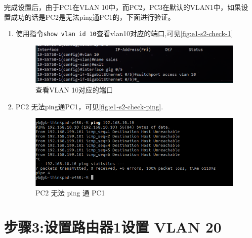 \documentclass{myreport}
\begin{document}
完成设置后，由于PC1在VLAN 10中，而PC2，PC3在默认的VLAN1中，如果设置成功的话是PC2是无法ping通PC1的，下面进行验证。

\begin{enumerate}
    \item 使用指令\texttt{show vlan id 10}查看vlan10对应的端口,可见\autoref{fig:e1-s2-check-1}
    \begin{figure}[htp]
        \centering
        \includegraphics[width=13cm]{"./figure/2018-05-04-09-10-21.png"}
        \caption{查看VLAN 10对应的端口}
        \label{fig:e1-s2-check-1}
    \end{figure}
    \item PC2 无法ping通PC1，可见\autoref{fig:e1-s2-check-ping}.
    \begin{figure}[htp]
        \centering
        \includegraphics[width=13cm]{"./figure/id001.png"}
        \caption{PC2 无法 ping 通 PC1}
        \label{fig:e1-s2-check-ping}
    \end{figure}
\end{enumerate}


\section{步骤3:设置路由器1设置 VLAN 20}
\end{document}
